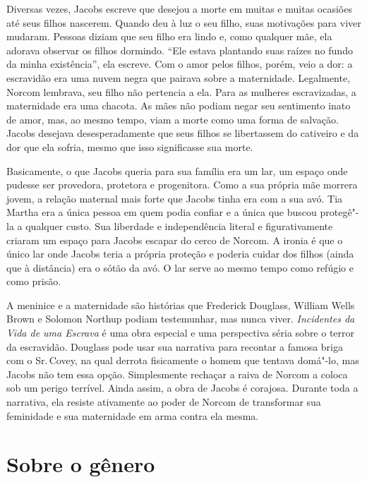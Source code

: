 Diversas vezes, Jacobs escreve que desejou a morte em muitas e muitas
ocasiões até seus filhos nascerem. Quando deu à luz o seu filho,
suas motivações para viver mudaram. Pessoas diziam que seu filho era
lindo e, como qualquer mãe, ela adorava observar os filhos dormindo. ``Ele
estava plantando suas raízes no fundo da minha existência'', ela
escreve. Com o amor pelos filhos, porém, veio a dor: a escravidão era uma nuvem
negra que pairava sobre a maternidade. Legalmente, Norcom lembrava, seu
filho não pertencia a ela. Para as mulheres escravizadas, a maternidade
era uma chacota. As mães não podiam negar seu sentimento inato de amor,
mas, ao mesmo tempo, viam a morte como uma forma de salvação. Jacobs
desejava desesperadamente que seus filhos se libertassem do cativeiro e
da dor que ela sofria, mesmo que isso significasse sua morte.

Basicamente, o que Jacobs queria para sua família era um lar, um espaço
onde pudesse ser provedora, protetora e progenitora. Como a sua própria
mãe morrera jovem, a relação maternal mais forte que Jacobs tinha era
com a sua avó. Tia Martha era a única pessoa em quem podia confiar e a
única que buscou protegê"-la a qualquer custo. Sua liberdade e
independência literal e figurativamente criaram um espaço para Jacobs
escapar do cerco de Norcom. A ironia é que o único lar onde Jacobs teria
a própria proteção e poderia cuidar dos filhos (ainda que à distância)
era o sótão da avó. O lar serve ao mesmo tempo como refúgio e como
prisão.

A meninice e a maternidade são histórias que Frederick Douglass, William
Wells Brown e Solomon Northup podiam testemunhar, mas nunca viver.
\emph{Incidentes da Vida de uma Escrava} é uma obra especial e uma
perspectiva séria sobre o terror da escravidão. Douglass pode usar sua
narrativa para recontar a famosa briga com o Sr.\,Covey, na qual derrota
fisicamente o homem que tentava domá"-lo, mas Jacobs não tem essa opção.
Simplesmente rechaçar a raiva de Norcom a coloca sob um perigo terrível.
Ainda assim, a obra de Jacobs é corajosa. Durante toda a narrativa, ela
resiste ativamente ao poder de Norcom de transformar sua feminidade e
sua maternidade em arma contra ela mesma.

\section{Sobre o gênero}

